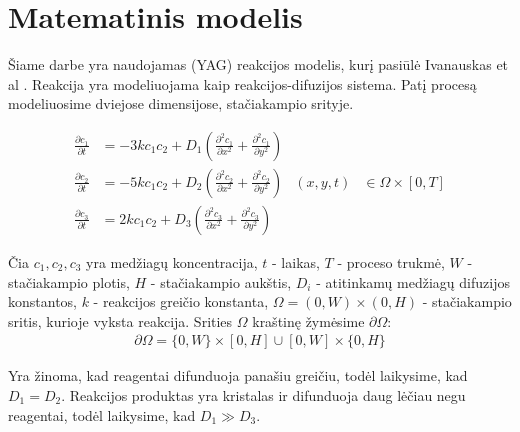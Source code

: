 
\section{Matematinis modelis}

Šiame darbe yra naudojamas (YAG) reakcijos modelis, kurį pasiūlė Ivanauskas et al \cite{ivanauskasModellingSolidState2005}. Reakcija yra modeliuojama kaip reakcijos-difuzijos sistema. Patį procesą modeliuosime dviejose dimensijose, stačiakampio srityje.

\begin{subequations} \label{rect}
	\begin{align}
		\frac{\partial c_1}{\partial t} & =-3kc_1c_2+D_1\left(\frac{\partial^2c_1}{\partial x^2}+\frac{\partial^2c_1}{\partial y^2}\right) \\
		\frac{\partial c_2}{\partial t} & =-5kc_1c_2+D_2\left(\frac{\partial^2c_2}{\partial x^2}+\frac{\partial^2c_2}{\partial y^2}\right) & (x, y, t)&\in\Omega\times[0, T]\\
		\frac{\partial c_3}{\partial t} & =2kc_1c_2+D_3\left(\frac{\partial^2c_3}{\partial x^2}+\frac{\partial^2c_3}{\partial y^2}\right)
	\end{align}
\end{subequations}

Čia $c_1,c_2,c_3$ yra medžiagų koncentracija, $t$ - laikas, $T$ - proceso trukmė, $W$ - stačiakampio plotis, $H$ - stačiakampio aukštis,
$D_i$ - atitinkamų medžiagų difuzijos konstantos, $k$ - reakcijos greičio konstanta, $\Omega=(0, W)\times(0, H)$ - stačiakampio sritis, kurioje vyksta reakcija. Srities $\Omega$ kraštinę žymėsime $\partial\Omega$:
\begin{align*}
    \partial\Omega=\{0, W\}\times[0, H]\cup[0, W]\times\{0, H\}
\end{align*}

Yra žinoma, kad reagentai difunduoja panašiu greičiu, todėl laikysime, kad $D_1=D_2$. Reakcijos produktas yra kristalas ir difunduoja daug lėčiau negu reagentai, todėl laikysime, kad $D_1 \gg D_3$.

